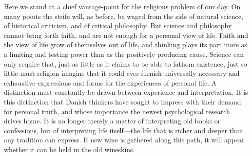 \documentclass[12pt,a4paper]{article}
\newcommand{\opage}[1]{\marginnote{\footnotesize\textit{[#1]}}}
\begin{document}
Here we stand at a chief vantage-point for the religious problem of our day. On many
points the strife will, as before, be waged from the side of natural science, of
historical criticism, and of critical philosophy. But science and philosophy cannot
bring forth faith, and are \opage{57}not enough for a personal view of life. Faith and the view
of life grow of themselves out of life, and thinking plays its part more as a limiting
and testing power than as the positively producing cause. Science can only require
that, just as little as it claims to be able to fathom existence, just so little must
religion imagine that it could ever furnish universally necessary and exhaustive
expressions and forms for the experiences of personal life. A distinction must
constantly be drawn between experience and interpretation. It is this distinction that
Danish thinkers have sought to impress with their demand for personal truth, and whose
importance the newest psychological research drives home. It is no longer merely a
matter of interpreting old books or confessions, but of interpreting life itself---the
life that is richer and deeper than any tradition can express. If new wine is gathered
along this path, it will appear whether it can be held in the old wineskins.
\end{document}
